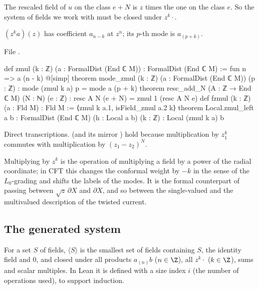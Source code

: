 The rescaled field of $u$ on the class $e+N$ is $z$ times the one on the class $e$. So the
system of fields we work with must be closed under $z^k\cdot$.

\begin{definition}\label{ch07:def:zmul}
$(z^k a)(z)$ has coefficient $a_{n-k}$ at $z^n$; its $p$-th mode is $a_{(p+k)}$.
\end{definition}

\noindent File .
\begin{leancode}
def zmul (k : ℤ) (a : FormalDist (End ℂ M)) : FormalDist (End ℂ M) := fun n => a (n - k)
@[simp] theorem mode_zmul (k : ℤ) (a : FormalDist (End ℂ M)) (p : ℤ) :
    mode (zmul k a) p = mode a (p + k)
theorem resc_add_N (A : ℤ → End ℂ M) (N : ℕ) (e : ℤ) :
    resc A N (e + N) = zmul 1 (resc A N e)
def fzmul (k : ℤ) (a : Fld M) : Fld M := ⟨zmul k a.1, isField_zmul a.2 k⟩
theorem Local.zmul_left {a b : FormalDist (End ℂ M)} (h : Local a b) (k : ℤ) :
    Local (zmul k a) b
\end{leancode}

\begin{dictionary}
Direct transcriptions.  (and its mirror ) hold
because multiplication by $z_1^k$ commutes with multiplication by $(z_1-z_2)^N$.
\end{dictionary}

\begin{physics}
Multiplying by $z^k$ is the operation of multiplying a field by a power of the radial coordinate; in CFT this changes the conformal weight by $-k$ in the sense of the $L_0$-grading and shifts the labels of the modes. It is the formal counterpart of passing between $\sqrt z\,\partial X$ and $\partial X$, and so between the single-valued and the multivalued description of the twisted current.
\end{physics}

\subsection{The generated system}

\begin{definition}\label{ch07:def:TGen}
For a set $S$ of fields, $\langle S\rangle$ is the smallest set of fields containing $S$, the
identity field and $0$, and closed under all products $a_{(n)}b$ ($n\in\Z$), all $z^k\cdot$
($k\in\Z$), sums and scalar multiples. In Lean it is defined with a size index $i$ (the number
of operations used), to support induction.
\end{definition}

